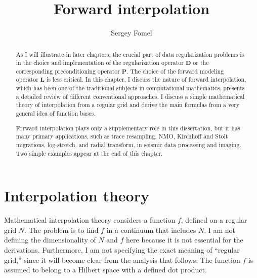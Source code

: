 \title{Forward interpolation}


\author{Sergey Fomel}

\newtheorem{property}{Property}

\maketitle

\label{chapter:forwd}

\begin{abstract}
As I will illustrate in later chapters, the crucial part of data
regularization problems is in the choice and implementation of the
regularization operator $\mathbf{D}$ or the corresponding
preconditioning operator $\mathbf{P}$. The choice of the forward
modeling operator $\mathbf{L}$ is less critical. In this chapter, I
discuss the nature of forward interpolation, which has been one of the
traditional subjects in computational mathematics. \cite{wolberg}
presents a detailed review of different conventional approaches. I
discuss a simple mathematical theory of interpolation from a regular
grid and derive the main formulas from a very general idea of function
bases.

Forward interpolation plays only a supplementary role in this
dissertation, but it has many primary applications, such as trace
resampling, NMO, Kirchhoff and Stolt migrations, log-stretch, and
radial transform, in seismic data processing and imaging. Two simple
examples appear at the end of this chapter.
\end{abstract}

\section{Interpolation theory}

Mathematical interpolation theory considers a function $f$, defined on
a regular grid $N$. The problem is to find $f$ in a continuum that
includes $N$. I am not defining the dimensionality of $N$ and $f$ here
because it is not essential for the derivations.  Furthermore, I am
not specifying the exact meaning of ``regular grid,'' since it will
become clear from the analysis that follows. The function $f$ is
assumed to belong to a Hilbert space with a defined dot product.

